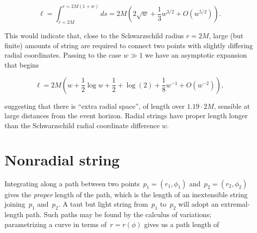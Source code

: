 
 \begin{equation}\label{ell}
   \ell =
   \int_{r=2M}^{r=2M(1+w)}ds
   =2M\left(2\sqrt{w} + \frac{1}{3}w^{3/2} + O(w^{5/2})\right).
 \end{equation}

This would indicate that, close to the Schwarzschild radius $r=2M$,
large (but finite) amounts of string are required to connect two
points with slightly differing radial coordinates.  Passing to the
case $w\gg 1$ we have an asymptotic expansion that begins

% 
\begin{equation}\label{asymptotic_ell}
  \ell = 2M\left(w +  \frac{1}{2}\log w + \frac{1}{2} + \log(2)  +  \frac{1}{8}w^{-1} + O(w^{-2})\right),
\end{equation}

\noindent suggesting that there is ``extra radial space'', of length
over $1.19\cdot 2M$, sensible at large distances from the event
horizon.  Radial strings have proper length longer than the
Schwarzschild radial coordinate difference $w$.

\section{Nonradial string}
Integrating along a path between two
points~$p_1=\left(r_1,\phi_1\right)$ and~$p_2=\left(r_2,\phi_2\right)$
gives the {\em proper} length of the path, which is the length of an
inextensible string joining~$p_1$ and~$p_2$.  A taut but light string
from~$p_1$ to~$p_2$ will adopt an extremal-length path.  Such paths
may be found by the calculus of variations; parametrizing a curve in
terms of~$r=r\left(\phi\right)$ gives us a path length of



